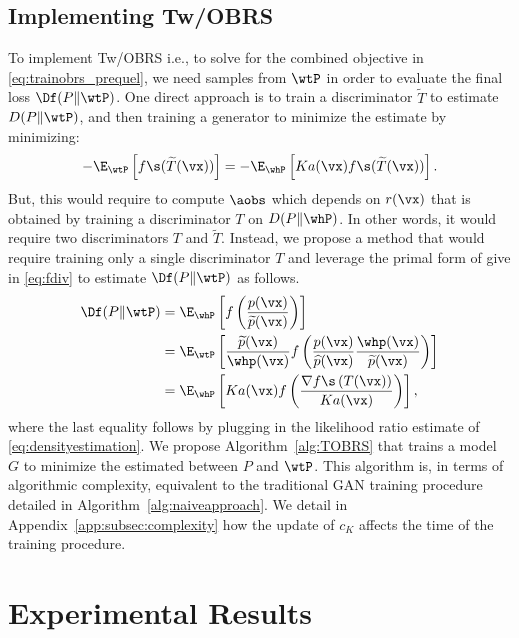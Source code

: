 \documentclass[twoside]{article}
\begin{document}
 \subsection{Implementing Tw/OBRS}
To implement Tw/OBRS i.e., to solve for the combined objective in \eqref{eq:trainobrs_prequel}, we need samples from $\wtP$ in order to evaluate the final loss $\Df(P\Vert \wtP)$.
One direct approach is to train a discriminator $\widetilde T$ to estimate $D(P\Vert \wtP)$, and then training a generator to minimize the estimate by minimizing:
\begin{align}
    -\E_{\wtP}\left[f\s(\widetilde T (\vx))\right]=-\E_{\whP}\left[Ka(\vx)f\s(\widetilde T (\vx))\right].
\end{align}
But, this would require to compute $\aobs$ which depends on $r(\vx)$ that is obtained by training a discriminator $T$ on $D(P\Vert \whP)$. In other words, it would require two discriminators $T$ and $\widetilde T$. Instead, we propose a method that would require training only a single discriminator $T$ and leverage the primal form of \fdiv give in \eqref{eq:fdiv} to estimate $\Df(P\Vert \wtP)$ as follows. 
\begin{align*}
        \Df(P\Vert \wtP) 
        &= \E_{\whP}\left [ f\left( \frac{p(\vx)}{\widetilde{p}(\vx)}\right)  \right]\\
        &= \E_{\wtP}\left [ \frac{\widetilde{p}(\vx)}{\whp(\vx)} f\left( \frac{p(\vx)}{\widehat{p}(\vx)}\frac{\whp(\vx)}{\widetilde{p}(\vx)}\right)  \right]\\
        &= \E_{\whP}\left [ Ka(\vx) f\left(\frac{\nabla f\s\left(T(\vx)\right)}{Ka(\vx)}\right)\right],
\end{align*}
where the last equality follows by plugging in the likelihood ratio estimate of \eqref{eq:densityestimation}.
We propose  Algorithm~\ref{alg:TOBRS} that trains a model $G$ to minimize the estimated \fdiv between $P$ and $\wtP$. This algorithm is, in terms of algorithmic complexity, equivalent to the traditional GAN training procedure detailed in Algorithm~\ref{alg:naiveapproach}. We detail in Appendix~\ref{app:subsec:complexity} how the update of $c_K$ affects the time of the training procedure.  




\section{Experimental Results}\label{sec:xp}
\end{document}
